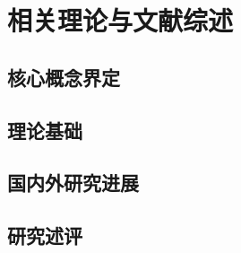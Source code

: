 \section{相关理论与文献综述}


\subsection{核心概念界定}


\subsection{理论基础}


\subsection{国内外研究进展}


\subsection{研究述评}

